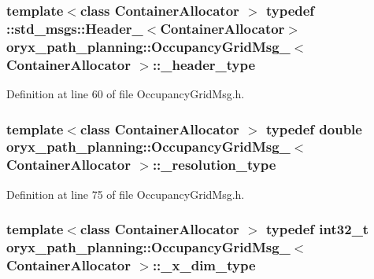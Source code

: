 \subsubsection[{\-\_\-header\-\_\-type}]{\setlength{\rightskip}{0pt plus 5cm}template$<$class Container\-Allocator $>$ typedef \-::std\-\_\-msgs\-::\-Header\-\_\-$<$\-Container\-Allocator$>$ {\bf oryx\-\_\-path\-\_\-planning\-::\-Occupancy\-Grid\-Msg\-\_\-}$<$ \-Container\-Allocator $>$\-::{\bf \-\_\-header\-\_\-type}}\label{structoryx__path__planning_1_1OccupancyGridMsg___a1de9e936e556a02bf7ee9a55459b037d}


\-Definition at line 60 of file \-Occupancy\-Grid\-Msg.\-h.

\subsubsection[{\-\_\-resolution\-\_\-type}]{\setlength{\rightskip}{0pt plus 5cm}template$<$class Container\-Allocator $>$ typedef double {\bf oryx\-\_\-path\-\_\-planning\-::\-Occupancy\-Grid\-Msg\-\_\-}$<$ \-Container\-Allocator $>$\-::{\bf \-\_\-resolution\-\_\-type}}\label{structoryx__path__planning_1_1OccupancyGridMsg___a808a535889e6829ea9cc11f5573a7a56}


\-Definition at line 75 of file \-Occupancy\-Grid\-Msg.\-h.

\subsubsection[{\-\_\-x\-\_\-dim\-\_\-type}]{\setlength{\rightskip}{0pt plus 5cm}template$<$class Container\-Allocator $>$ typedef int32\-\_\-t {\bf oryx\-\_\-path\-\_\-planning\-::\-Occupancy\-Grid\-Msg\-\_\-}$<$ \-Container\-Allocator $>$\-::{\bf \-\_\-x\-\_\-dim\-\_\-type}}\label{structoryx__path__planning_1_1OccupancyGridMsg___af8bbed04bc2d2e54b8450f99e149934d}



